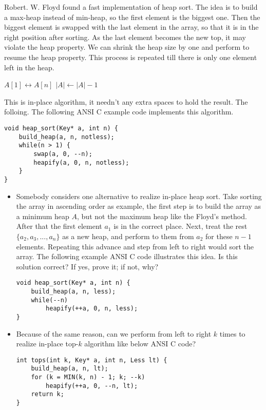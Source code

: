 \documentclass{article}
\begin{document}
Robert. W. Floyd found a fast implementation of heap sort.
The idea is to build a max-heap instead of min-heap, so the first
element is the biggest one. Then the biggest element is swapped
with the last element in the array, so that it is in the right
position after sorting. As the last element becomes the new top,
it may violate the heap property. We can shrink the heap size
by one and perform
 to resume the heap property.
This process
is repeated till there is only one element left in the heap.

\begin{algorithmic}[1]
  \State {}
    \State {} $A[1] \leftrightarrow A[n]$
    \State $|A| \gets |A| - 1$
    \State {}
  \EndWhile
\EndFunction
\end{algorithmic}

This is in-place algorithm, it needn't any extra spaces to hold
the result. The folloing. The following ANSI C example code
implements this algorithm.

\lstset{language=C}
\begin{lstlisting}
void heap_sort(Key* a, int n) {
    build_heap(a, n, notless);
    while(n > 1) {
        swap(a, 0, --n);
        heapify(a, 0, n, notless);
    }
}
\end{lstlisting}

\begin{Exercise}
\begin{itemize}
\item Somebody considers one alternative to realize in-place heap sort. Take
sorting the array in ascending order as example, the first step is to build
the array as a minimum heap $A$, but not the maximum heap like the Floyd's method.
After that the first element $a_1$ is in the correct place. Next, treat
the rest $\{a_2, a_3, ..., a_n\}$ as a new heap, and perform
 to them from $a_2$ for these $n-1$ elements. Repeating this
advance and  step from left to right would sort the array.
The following example ANSI C code illustrates this idea.
Is this solution correct? If yes, prove it; if not, why?
\lstset{language=C}
\begin{lstlisting}
void heap_sort(Key* a, int n) {
    build_heap(a, n, less);
    while(--n)
        heapify(++a, 0, n, less);
}
\end{lstlisting}

\item Because of the same reason, can we perform  from
left to right $k$ times to realize in-place top-$k$ algorithm like below
ANSI C code?
\lstset{language=C}
\begin{lstlisting}
int tops(int k, Key* a, int n, Less lt) {
    build_heap(a, n, lt);
    for (k = MIN(k, n) - 1; k; --k)
        heapify(++a, 0, --n, lt);
    return k;
}
\end{lstlisting}
\end{itemize}
\end{Exercise}
\end{document}
